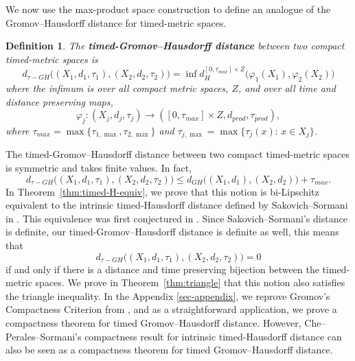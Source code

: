 \documentclass[a4paper,12pt,reqno]{amsart}
\theoremstyle{plain}
\newtheorem{defn}[thm]{Definition}
\begin{document}
We now use the max-product space construction to define an analogue of the Gromov--Hausdorff distance for timed-metric spaces.



\begin{defn}\label{defn:t-H-new}
The {\bf timed-Gromov--Hausdorff distance} between two 
compact timed-metric spaces is
\begin{equation*}
d_{\tau-GH}\bigg((X_1,d_1,\tau_1),(X_2,d_2,\tau_2)\bigg)=
\inf d_H^{[0,\tau_{max}]\times Z}\bigg(\varphi_1(X_1),\varphi_2(X_2)\bigg)
\end{equation*}
where the infimum is over all compact metric spaces, $Z$, and over all time and distance preserving maps,
\[
\varphi_j: (X_j,d_j,\tau_j)\to
([0,\tau_{max}]\times Z, d_{prod}, \tau_{prod}),
\]
where $
\tau_{max}=\max\{\tau_{1,\max},\tau_{2,\max}\}$ and $\tau_{j,\max}=\max\{\tau_j(x):\, x\in X_j\}$.
\end{defn}

The
timed-Gromov--Hausdorff distance between two 
compact timed-metric spaces is symmetric and
takes finite values.  In fact,
\[
d_{\tau-GH}\bigg((X_1,d_1,\tau_1),(X_2,d_2,\tau_2)\bigg)\le
d_{GH}\bigg((X_1,d_1),(X_2,d_2)\bigg)+\tau_{max}.
\]
In Theorem~\ref{thm:timed-H-equiv}, we prove that this notion is bi-Lipschitz equivalent to 
the intrinsic timed-Hausdorff distance defined by
Sakovich--Sormani in \cite[Definition~4.22]{SakSor-Notions}. This equivalence was first conjectured in \cite[Remark 4.26]{SakSor-Notions}.
Since Sakovich--Sormani's distance is definite,  our timed-Gromov--Hausdorff distance is definite as well, this means that
\begin{equation*}
d_{\tau-GH}\bigg((X_1,d_1,\tau_1),(X_2,d_2,\tau_2)\bigg)=0
\end{equation*}
if and only if there is a distance and time preserving bijection
between the timed-metric spaces.  We prove in Theorem~\ref{thm:triangle} that
this notion also satisfies the triangle inequality. In the Appendix \ref{sec-appendix}, we reprove Gromov's Compactness Criterion from \cite{Gromov-poly}, and as a straightforward application, we prove a compactness theorem for timed Gromov--Hausdorff distance. However, Che--Perales--Sormani's compactness result for intrinsic timed-Hausdorff distance \cite{Che-Perales-Sormani-2025} can also be seen as a compactness theorem for timed Gromov--Hausdorff distance. 
\end{document}
